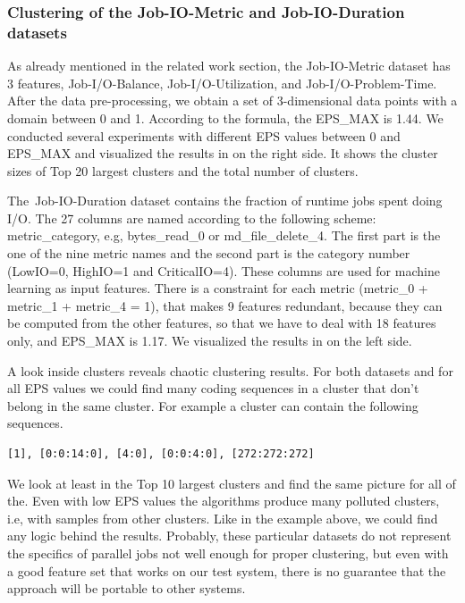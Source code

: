 \documentclass[]{llncs}
\begin{document}
\subsubsection{Clustering of the Job-IO-Metric and Job-IO-Duration datasets}
As already mentioned in the related work section, the Job-IO-Metric dataset has 3 features, Job-I/O-Balance, Job-I/O-Utilization, and Job-I/O-Problem-Time.
After the data pre-processing, we obtain a set of 3-dimensional data points with a domain between 0 and 1.
According to the formula, the EPS\_MAX is 1.44.
We conducted several experiments with different EPS values between 0 and EPS\_MAX and visualized the results in  on the right side.
It shows the cluster sizes of Top 20 largest clusters and the total number of clusters.

The\ Job-IO-Duration dataset contains the fraction of runtime jobs spent doing I/O.
 The 27 columns are named according to the following scheme: metric\_category, e.g, bytes\_read\_0 or md\_file\_delete\_4.
The first part is the one of the nine metric names and the second part is the category number (LowIO=0, HighIO=1 and CriticalIO=4).
These columns are used for machine learning as input features.
There is a constraint for each metric (metric\_0 + metric\_1 + metric\_4 = 1), that makes 9 features redundant, because they can be computed from the other features, so that we have to deal with 18 features only, and EPS\_MAX is 1.17.
We visualized the results in  on the left side.

A look inside clusters reveals chaotic clustering results.
For both datasets and for all EPS values we could find many coding sequences in a cluster that don’t belong in the same cluster.
For example a cluster can contain the following sequences.

\begin{lstlisting}
[1], [0:0:14:0], [4:0], [0:0:4:0], [272:272:272] 
\end{lstlisting}

We look at least in the Top 10 largest clusters and find the same picture for all of the.
Even with low EPS values the algorithms produce many polluted clusters, i.e, with samples from other clusters.
Like in the example above, we could find any logic behind the results.
Probably, these particular datasets do not represent the specifics of parallel jobs not well enough for proper clustering, but even with a good feature set that works on our test system, there is no guarantee that the approach will be portable to other systems.
\end{document}
